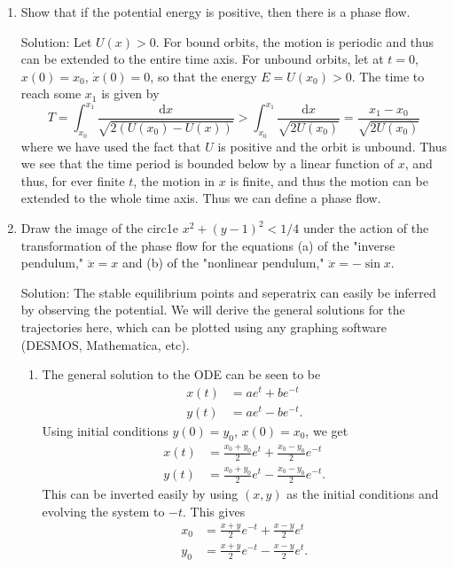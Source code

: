 \begin{enumerate}
\item Show that if the potential energy is positive, then there is a phase flow.\par
Solution: Let $U(x)>0$. For bound orbits, the motion is periodic and thus can be extended to the entire time axis. For unbound orbits, let at $t=0$, $x(0) = x_0$, $\dot{x}(0)= 0$, so that the energy $E = U(x_0)>0$. The time to reach some $x_1$ is given by
\begin{equation}
	T = \int_{x_0}^{x_1}\frac{\mathrm{d}x}{\sqrt{2(U(x_0)-U(x))}}>\int_{x_0}^{x_1}\frac{\mathrm{d}x}{\sqrt{2U(x_0)}} = \frac{x_1-x_0}{\sqrt{2U(x_0)}}
\end{equation}
where we have used the fact that $U$ is positive and the orbit is unbound. Thus we see that the time period is bounded below by a linear function of $x$, and thus, for ever finite $t$, the motion in $x$ is finite, and thus the motion can be extended to the whole time axis. Thus we can define a phase flow. 
\item  Draw the image of the circ1e $x^2 + (y - 1)^2 < 1/4$ under the action of the transformation of the phase flow for the equations (a) of the "inverse pendulum," $\ddot{x} = x$ and (b) of the "nonlinear pendulum," $\ddot{x} = -\sin x$.\par
Solution: The stable equilibrium points and seperatrix can easily be inferred by observing the potential. We will derive the general solutions for the trajectories here, which can be plotted using any graphing software (DESMOS, Mathematica, etc).\par
\begin{enumerate}
	\item The general solution to the ODE can be seen to be 
\begin{align}\label{key}
	x(t) &= a e^t + b e^{-t}\\
	y(t) &= a e^t - b e^{-t}.
\end{align}
Using initial conditions $y(0) = y_0$, $x(0) = x_0$, we get
\begin{align}\label{key}
	x(t) &=\frac{x_0+y_0}{2}e^t + \frac{x_0-y_0}{2} e^{-t}\\
	y(t) &= \frac{x_0+y_0}{2} e^t - \frac{x_0-y_0}{2} e^{-t}.
\end{align}
This can be inverted easily by using $(x,y)$ as the initial conditions and evolving the system to $-t$. This gives
\begin{align}\label{key}
	x_0 &=\frac{x+y}{2}e^{-t} + \frac{x-y}{2} e^{t}\\
	y_0 &= \frac{x+y}{2} e^{-t} - \frac{x-y}{2} e^{t}.

\end{align}
\end{enumerate}
\end{enumerate}
